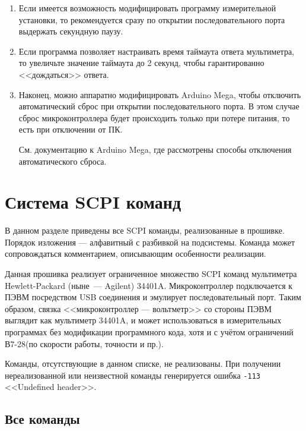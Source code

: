\documentclass[12pt, a4paper]{article}
\newcommand{\SCPI}{\mbox{SCPI}}
\newcommand{\V}{\mbox{В7-28}}
\newcommand{\Arduino}{Arduino Mega}
\newcommand{\CMD}[1]{{\tt #1}}
\begin{document}
\begin{enumerate}

\item Если имеется возможность модифицировать программу измерительной установки, то рекомендуется сразу по открытии последовательного порта выдержать секундную паузу.

\item Если программа позволяет настраивать время таймаута ответа мультиметра, то увеличьте значение таймаута до 2 секунд, чтобы гарантированно <<дождаться>> ответа.

\item Наконец, можно аппаратно модифицировать {\Arduino}, чтобы отключить автоматический сброс при открытии последовательного порта. В этом случае сброс микроконтроллера будет происходить только при потере питания, то есть при отключении от ПК.

См. документацию к {\Arduino}, где рассмотрены способы отключения автоматического сброса.

\end{enumerate}


\section{Система SCPI команд}

В данном разделе приведены все \SCPI{} команды, реализованные в прошивке. Порядок изложения --- алфавитный с разбивкой на подсистемы. Команда может сопровождаться комментарием, описывающим особенности реализации.

Данная прошивка реализует ограниченное множество \SCPI{} команд мультиметра Hewlett-Packard (ныне~--- Agilent) \mbox{34401A}. Микроконтроллер подключается к ПЭВМ посредством USB соединения и эмулирует последовательный порт. Таким образом, связка <<микроконтроллер --- вольтметр>> со стороны ПЭВМ выглядит как мультиметр \mbox{34401A}, и может использоваться в измерительных программах без модификации программного кода, хотя и с учётом ограничений \V (по скорости работы, точности и пр.).

Команды, отсутствующие в данном списке, не реализованы. При получении нереализованной или неизвестной команды генерируется ошибка \CMD{-113} <<Undefined header>>.

\subsection{Все команды}
\end{document}
